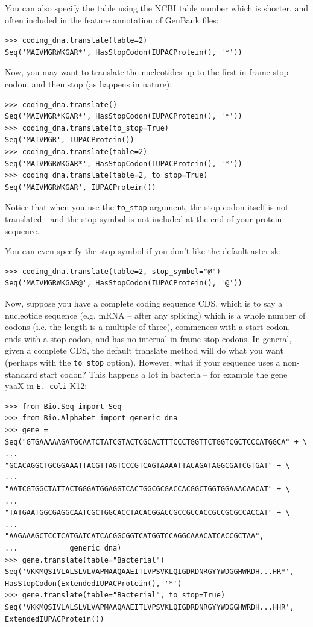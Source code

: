 \documentclass{report}
\begin{document}
You can also specify the table using the NCBI table number which is shorter, and often included in the feature annotation of GenBank files:
\begin{verbatim}
>>> coding_dna.translate(table=2)
Seq('MAIVMGRWKGAR*', HasStopCodon(IUPACProtein(), '*'))
\end{verbatim}

Now, you may want to translate the nucleotides up to the first in frame stop codon,
and then stop (as happens in nature):
\begin{verbatim}
>>> coding_dna.translate()
Seq('MAIVMGR*KGAR*', HasStopCodon(IUPACProtein(), '*'))
>>> coding_dna.translate(to_stop=True)
Seq('MAIVMGR', IUPACProtein())
>>> coding_dna.translate(table=2)
Seq('MAIVMGRWKGAR*', HasStopCodon(IUPACProtein(), '*'))
>>> coding_dna.translate(table=2, to_stop=True)
Seq('MAIVMGRWKGAR', IUPACProtein())
\end{verbatim}
\noindent Notice that when you use the \verb|to_stop| argument, the stop codon itself
is not translated - and the stop symbol is not included at the end of your protein
sequence.

You can even specify the stop symbol if you don't like the default asterisk:
\begin{verbatim}
>>> coding_dna.translate(table=2, stop_symbol="@")
Seq('MAIVMGRWKGAR@', HasStopCodon(IUPACProtein(), '@'))
\end{verbatim}

Now, suppose you have a complete coding sequence CDS, which is to say a
nucleotide sequence (e.g. mRNA -- after any splicing) which is a whole number
of codons (i.e. the length is a multiple of three), commences with a start
codon, ends with a stop codon, and has no internal in-frame stop codons.
In general, given a complete CDS, the default translate method will do what
you want (perhaps with the \verb|to_stop| option). However, what if your
sequence uses a non-standard start codon? This happens a lot in bacteria --
for example the gene yaaX in \texttt{E. coli} K12:

\begin{verbatim}
>>> from Bio.Seq import Seq
>>> from Bio.Alphabet import generic_dna
>>> gene = Seq("GTGAAAAAGATGCAATCTATCGTACTCGCACTTTCCCTGGTTCTGGTCGCTCCCATGGCA" + \
...            "GCACAGGCTGCGGAAATTACGTTAGTCCCGTCAGTAAAATTACAGATAGGCGATCGTGAT" + \
...            "AATCGTGGCTATTACTGGGATGGAGGTCACTGGCGCGACCACGGCTGGTGGAAACAACAT" + \
...            "TATGAATGGCGAGGCAATCGCTGGCACCTACACGGACCGCCGCCACCGCCGCGCCACCAT" + \
...            "AAGAAAGCTCCTCATGATCATCACGGCGGTCATGGTCCAGGCAAACATCACCGCTAA",
...            generic_dna)
>>> gene.translate(table="Bacterial")
Seq('VKKMQSIVLALSLVLVAPMAAQAAEITLVPSVKLQIGDRDNRGYYWDGGHWRDH...HR*',
HasStopCodon(ExtendedIUPACProtein(), '*')
>>> gene.translate(table="Bacterial", to_stop=True)
Seq('VKKMQSIVLALSLVLVAPMAAQAAEITLVPSVKLQIGDRDNRGYYWDGGHWRDH...HHR',
ExtendedIUPACProtein())
\end{verbatim}
\end{document}
